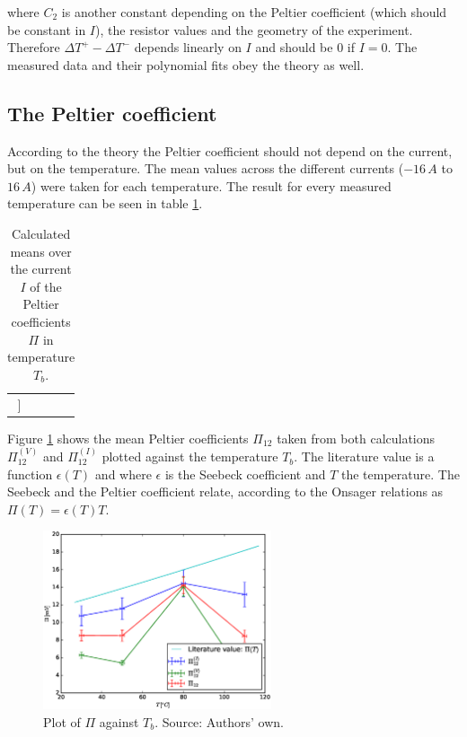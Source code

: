 \documentclass[a4paper]{article}
\begin{document}
where $C_2$ is another constant depending on the Peltier coefficient (which should be constant in $I$), the resistor values and the geometry of the experiment. Therefore $\Delta T^{+} - \Delta T^{-}$ depends linearly on $I$ and should be $0$ if $I=0$. The measured data and their polynomial fits obey the theory as well.

\subsection{The Peltier coefficient}

According to the theory the Peltier coefficient should not depend on the current, but on the temperature. The mean values across the different currents ($-16 \, A$ to $16 \, A$) were taken for each temperature. The result for every measured temperature can be seen in table \ref{tab:peltierCoeffs}.

\begin{table}[H]
\centering
\begin{tabular}{r|rr|r}
\hline
[[PeltierTable]]
\end{tabular}
\caption{Calculated means over the current $I$ of the Peltier coefficients $\Pi$ in temperature $T_b$.}
\label{tab:peltierCoeffs}
\end{table}

Figure \ref{fig:pivst} shows the mean Peltier coefficients $\Pi_{12}$ taken from both calculations $\Pi_{12}^{(V)}$ and $\Pi_{12}^{(I)}$ plotted against the temperature $T_b$. The literature value is a function $\epsilon(T)$ \cite{bentley98} and \cite{guan2013} where $\epsilon$ is the Seebeck coefficient and $T$ the temperature. The Seebeck and the Peltier coefficient relate, according to the Onsager relations as $\Pi(T) = \epsilon(T) T$.

\begin{figure}[H]
\centering
\includegraphics[width=0.6\textwidth]{plots/Pi_vs_T.eps}
\caption{Plot of $\Pi$ against $T_b$. Source: Authors' own.}
\label{fig:pivst}
\end{figure}
\end{document}
